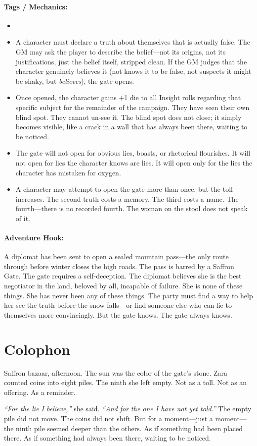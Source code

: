 \paragraph{Tags / Mechanics:}
\begin{itemize}
\item [TRUTH] [THRESHOLD] [REVELATION]
\item A character must declare a truth about themselves that is actually false. The GM may ask the player to describe the belief---not its origins, not its justifications, just the belief itself, stripped clean. If the GM judges that the character genuinely believes it (not knows it to be false, not suspects it might be shaky, but \textit{believes}), the gate opens.
\item Once opened, the character gains +1 die to all Insight rolls regarding that specific subject for the remainder of the campaign. They have seen their own blind spot. They cannot un-see it. The blind spot does not close; it simply becomes visible, like a crack in a wall that has always been there, waiting to be noticed.
\item The gate will not open for obvious lies, boasts, or rhetorical flourishes. It will not open for lies the character knows are lies. It will open only for the lies the character has mistaken for oxygen.
\item A character may attempt to open the gate more than once, but the toll increases. The second truth costs a memory. The third costs a name. The fourth---there is no recorded fourth. The woman on the stool does not speak of it.
\end{itemize}

\paragraph{Adventure Hook:}
A diplomat has been sent to open a sealed mountain pass---the only route through before winter closes the high roads. The pass is barred by a Saffron Gate. The gate requires a self-deception. The diplomat believes she is the best negotiator in the land, beloved by all, incapable of failure. She is none of these things. She has never been any of these things. The party must find a way to help her see the truth before the snow falls---or find someone else who can lie to themselves more convincingly. But the gate knows. The gate always knows.

\section*{Colophon}
Saffron bazaar, afternoon. The sun was the color of the gate's stone. Zara counted coins into eight piles. The ninth she left empty. Not as a toll. Not as an offering. As a reminder.

\textit{``For the lie I believe,''} she said. \textit{``And for the one I have not yet told.''} The empty pile did not move. The coins did not shift. But for a moment---just a moment---the ninth pile seemed deeper than the others. As if something had been placed there. As if something had always been there, waiting to be noticed.